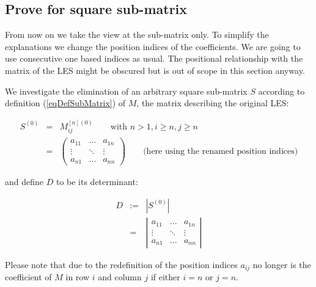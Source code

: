 

\subsection{Prove for square sub-matrix}

From now on we take the view at the sub-matrix only. To simplify the
explanations we change the position indices of the coefficients. We are
going to use consecutive one based indices as usual. The positional
relationship with the matrix of the LES might be obscured but is out of
scope in this section anyway.

We investigate the elimination of an arbitrary square sub-matrix $S$
according to definition (\ref{eqDefSubMatrix}) of $M$, the matrix describing
the original LES:

\begin{eqnarray*}
S^{(0)} & = & M^{[n](0)}_{ij}\qquad \text{with } n>1, i \geq n, j \geq n \\
        & = &
\left(
\begin{array}{ccc}
a_{11} & \ldots & a_{1n} \\
\vdots & \ddots & \vdots \\
a_{n1} & \ldots & a_{nn}
\end{array}
\right) \qquad \text{(here using the renamed position indices)}
\end{eqnarray*}

\noindent
and define $D$ to be its determinant:

\begin{eqnarray*}
D & := & \left| S^{(0)} \right| \\
  & =  &
\left|
\begin{array}{ccc}
a_{11} & \ldots & a_{1n} \\
\vdots & \ddots & \vdots \\
a_{n1} & \ldots & a_{nn}
\end{array}
\right|
\end{eqnarray*}

\noindent
Please note that due to the redefinition of the position indices $a_{ij}$
no longer is the coefficient of $M$ in row $i$ and column $j$ if either
$i=n$ or $j=n$.

